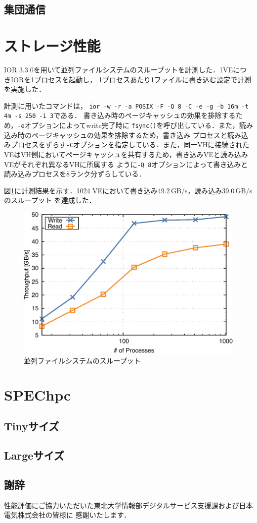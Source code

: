 ﻿\documentclass[submit,techrep,noauthor]{ipsj}
\begin{document}
\subsection{集団通信}

\section{ストレージ性能}

IOR 3.3.0を用いて並列ファイルシステムのスループットを計測した．1VEにつきIORを1プロセスを起動し，
1プロセスあたり1ファイルに書き込む設定で計測を実施した．

計測に用いたコマンドは，
\texttt{ior -w -r -a POSIX -F -Q 8 -C -e -g -b 16m -t 4m -s 250 -i 3}である．
書き込み時のページキャッシュの効果を排除するため，\texttt{-e}オプションによってwrite完了時に
\texttt{fsync()}を呼び出している．また，読み込み時のページキャッシュの効果を排除するため，書き込み
プロセスと読み込みプロセスをずらす\texttt{-C}オプションを指定している．また，同一VHに接続された
VEはVH側においてページキャッシュを共有するため，書き込みVEと読み込みVEがそれぞれ異なるVHに所属する
ように\texttt{-Q 8}オプションによって書き込みと読み込みプロセスを8ランク分ずらしている．

図\ref{fig:ior}に計測結果を示す．1024 VEにおいて書き込み49.2\,GB/s，読み込み39.0\,GB/sのスループット
を達成した．

\begin{figure}
  \centering
  \includegraphics{figs/ior.pdf}
  \caption{並列ファイルシステムのスループット}\label{fig:ior}
\end{figure}

\section{SPEChpc}

\subsection{Tinyサイズ}

\subsection{Largeサイズ}

\subsection*{謝辞}

性能評価にご協力いただいた東北大学情報部デジタルサービス支援課および日本電気株式会社の皆様に
感謝いたします．



\end{document}
